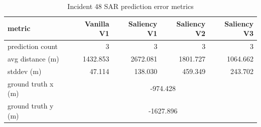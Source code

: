 \begin{table}[ht]
\centering
\caption{Incident 48 SAR prediction error metrics}
\label{tab:sar-incident-48}
\begin{tabular}{lrrrr}
\hline
metric & Vanilla V1 & Saliency V1 & Saliency V2 & Saliency V3 \\
\hline
prediction count & 3 & 3 & 3 & 3 \\
avg distance (m) & 1432.853 & 2672.081 & 1801.727 & 1064.662 \\
stddev (m) & 47.114 & 138.030 & 459.349 & 243.702 \\
ground truth x (m) & \multicolumn{4}{c}{-974.428} \\
ground truth y (m) & \multicolumn{4}{c}{-1627.896} \\
\hline
\end{tabular}
\end{table}
